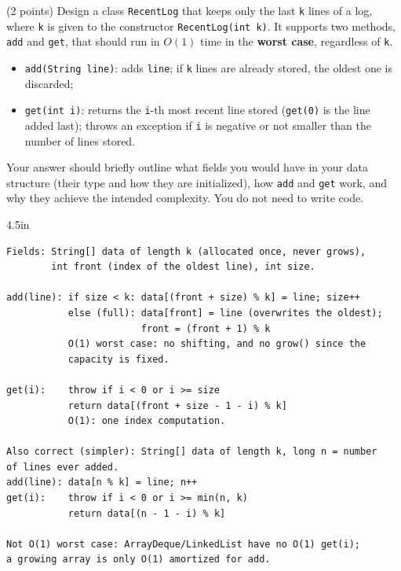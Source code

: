 \begin{question}
(2 points) Design a class \lstinline|RecentLog| that keeps only the last \lstinline|k| lines of a log, where \lstinline|k| is given to the constructor \lstinline|RecentLog(int k)|. It supports two methods, \lstinline|add| and \lstinline|get|, that should run in $O(1)$ time in the \textbf{worst case}, regardless of \lstinline|k|.
\begin{itemize}[leftmargin=2em,itemsep=1pt,topsep=2pt]
\item \lstinline|add(String line)|: adds \lstinline|line|; if \lstinline|k| lines are already stored, the oldest one is discarded;
\item \lstinline|get(int i)|: returns the \lstinline|i|-th most recent line stored (\lstinline|get(0)| is the line added last); throws an exception if \lstinline|i| is negative or not smaller than the number of lines stored.
\end{itemize}

Your answer should briefly outline what fields you would have in your data structure (their type and how they are initialized), how \lstinline|add| and \lstinline|get| work, and why they achieve the intended complexity. You do not need to write code.

\begin{answerspace}{4.5in}
\ifanswers
\begin{verbatim}
Fields: String[] data of length k (allocated once, never grows),
        int front (index of the oldest line), int size.

add(line): if size < k: data[(front + size) % k] = line; size++
           else (full): data[front] = line (overwrites the oldest);
                        front = (front + 1) % k
           O(1) worst case: no shifting, and no grow() since the
           capacity is fixed.

get(i):    throw if i < 0 or i >= size
           return data[(front + size - 1 - i) % k]
           O(1): one index computation.

Also correct (simpler): String[] data of length k, long n = number
of lines ever added.
add(line): data[n % k] = line; n++
get(i):    throw if i < 0 or i >= min(n, k)
           return data[(n - 1 - i) % k]

Not O(1) worst case: ArrayDeque/LinkedList have no O(1) get(i);
a growing array is only O(1) amortized for add.
\end{verbatim}
\fi
\end{answerspace}
\end{question}
